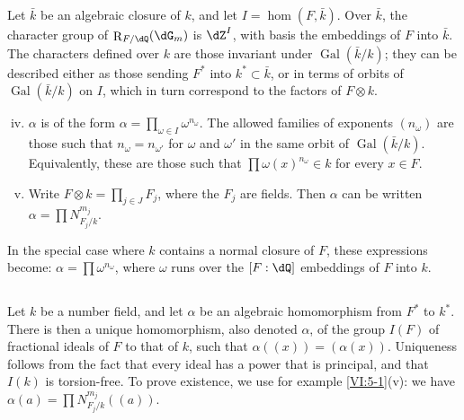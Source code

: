 \documentclass[oneside]{book}
\DeclareMathOperator{\gal}{Gal}
\DeclareMathOperator{\res}{R} %
\newcounter{char}
\theoremstyle{sga-source}
\theoremstyle{sga-source-dash}
\theoremstyle{sga-source-dotdash}
\theoremstyle{sga-source-number-note-dash}
\theoremstyle{sga-source-note-number-dotdash}
\theoremstyle{sga-source-example-dotdash}
\theoremstyle{sga-source-inline-number}
\theoremstyle{sga-source-bare-number}
\theoremstyle{sga-source}
\newcommand{\PrintPage}[1]{}\newcommand{\MathPage}[1]{}\newcommand{\PrintCite}[2]{#1}\newcommand{\var}[3]{#1}
\begin{document}
Let $\bar k$ be an algebraic closure of $k$, and let $I=\hom(F,\bar k)$. Over 
$\bar k$, the character group of $\res_{F/\dQ}(\dG_m)$ is $\dZ^I$, with basis 
the embeddings of $F$ into $\bar k$. The characters defined over $k$ 
are those invariant under $\gal(\bar k/k)$; they can be described either as 
those sending $F^\ast$ into $k^\ast\subset \bar k$, or in terms of 
orbits of $\gal(\bar k/k)$ on $I$, which in turn correspond to the factors of 
$F\otimes k$. 
\begin{enumerate}[(i)]
\setcounter{enumi}{3}
  \item $\alpha$ is of the form 
    $\alpha=\prod_{\omega\in I} \omega^{n_\omega}$. The allowed families of exponents 
    $(n_\omega)$ are those such that $n_\omega=n_{\omega'}$ for 
    $\omega$ and $\omega'$ in the same orbit of $\gal(\bar k/k)$. Equivalently, these 
    are those such that $\prod \omega(x)^{n_\omega}\in k$ for every 
    $x\in F$. 
  \PrintPage{209}
\item Write $F\otimes k=\prod_{j\in J} F_j$, where the $F_j$ are fields. 
    Then $\alpha$ can be written $\alpha=\prod N_{F_j/k}^{m_j}$. 
\end{enumerate}

In the special case where $k$ contains a normal closure of $F$, these 
expressions become: $\alpha=\prod \omega^{n_\omega}$, where $\omega$ 
runs over the $[F:\dQ]$ embeddings of $F$ into $k$. 





\subsection{}\label{VI:5-2}

Let $k$ be a number field, and let $\alpha$ be an algebraic homomorphism 
from $F^\ast$ to $k^\ast$. There is then a unique 
homomorphism, also denoted $\alpha$, of the group $I(F)$ 
of fractional ideals of $F$ to that of $k$, such that $\alpha((x))=(\alpha(x))$. 
Uniqueness follows from the fact that every ideal has a power that is 
principal, and that $I(k)$ is torsion-free. To prove 
existence, we use for example \ref{VI:5-1}(v): we have 
$\alpha(a) = \prod N_{F_j/k}^{m_j}((a))$. 





\subsection{}\label{VI:5-3}
\end{document}
